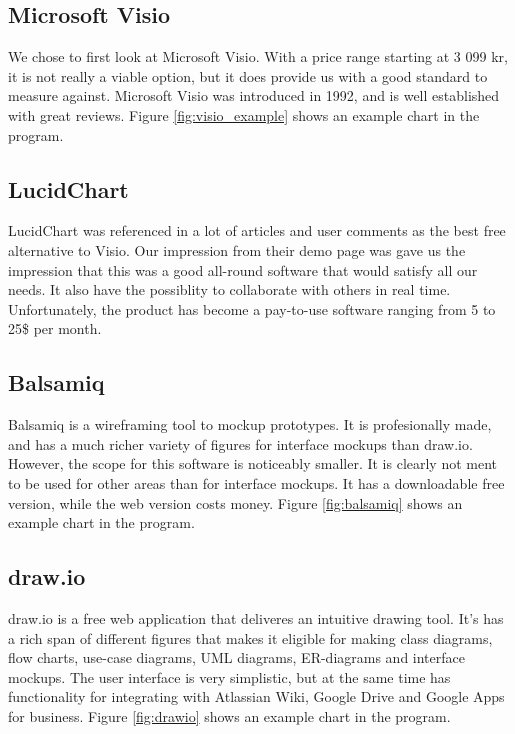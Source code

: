 \documentclass{report}
\begin{document}
\subsection{Microsoft Visio}
We chose to first look at Microsoft Visio\cite{website:microsoft_visio}. With a price range starting at 3 099 kr, it is not really a viable option, but it does provide us with a good standard to measure against. Microsoft Visio was introduced in 1992\cite{website:visio_wiki}, and is well established with great reviews\cite{website:visio_review}\cite{website:visio_review2}. 
Figure \ref{fig:visio_example} shows an example chart in the program.

\subsection{LucidChart}
LucidChart\cite{website:lucidchart} was referenced in a lot of articles and user comments as the best free alternative to Visio\cite{website:visio_alternatives}. Our impression from their demo page was gave us the impression that this was a good all-round software that would satisfy all our needs. It also have the possiblity to collaborate with others in real time. Unfortunately, the product has become a pay-to-use software ranging from 5 to 25\$ per month.

\subsection{Balsamiq}
Balsamiq\cite{website:balsamiq} is a wireframing tool to mockup prototypes. It is profesionally made, and has a much richer variety of figures for interface mockups than draw.io. However, the scope for this software is noticeably smaller. It is clearly not ment to be used for other areas than for interface mockups. It has a downloadable free version, while the web version costs money. 
Figure \ref{fig:balsamiq} shows an example chart in the program.

\subsection{draw.io}
draw.io\cite{website:draw_io} is a free web application that deliveres an intuitive drawing tool. It's has a rich span of different figures that makes it eligible for making class diagrams, flow charts, use-case diagrams, UML diagrams, ER-diagrams and interface mockups. The user interface is very simplistic, but at the same time has functionality for integrating with Atlassian Wiki, Google Drive and Google Apps for business.
Figure \ref{fig:drawio} shows an example chart in the program.
\end{document}
